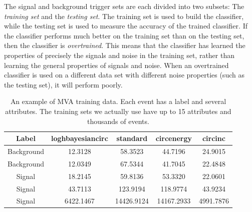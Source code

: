 \documentclass[11pt]{cuthesis}
\begin{document}
The signal and background trigger sets are each divided into two subsets: The \emph{training set} and the \emph{testing set}. The training set is used to build the classifier, while the testing set is used to measure the accuracy of the trained classifier. If the classifier performs much better on the training set than on the testing set, then the classifier is \emph{overtrained}. This means that the classifier has learned the properties of precisely the signals and noise in the training set, rather than learning the general properties of signals and noise. When an overtrained classifier is used on a different data set with different noise properties (such as the testing set), it will perform poorly. 

\begin{table}
\begin{tabular}{| c | c | c | c | c |} 
 \hline
Label & loghbayesiancirc & standard & circenergy & circinc  \\ [0.5ex] 
 \hline\hline
Background & 12.3128 & 58.3523 & 44.7196 & 24.9015 \\ 
 \hline
Background & 12.0349 & 67.5344 & 41.7045 & 22.4848 \\
 \hline
Signal & 18.2145 & 59.8136 & 53.3320 & 22.0601 \\
 \hline
Signal & 43.7113 & 123.9194 & 118.9774 & 43.9234 \\
 \hline
Signal & 6422.1467 & 14426.9124 & 14167.2933 & 4991.7876 \\ [1ex] 
 \hline
 
\end{tabular}
\caption{An example of MVA training data. Each event has a label and several attributes. The training sets we actually use have up to 15 attributes and thousands of events.}
\label{table:1}
\end{table}
\end{document}
